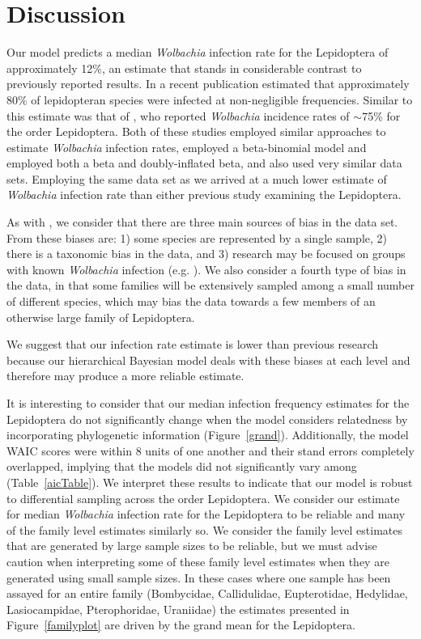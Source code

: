 \documentclass{frontiersSCNS}
\begin{document}
\section{Discussion}
Our model predicts a median \emph{Wolbachia} infection rate for the Lepidoptera of approximately 12\%, an estimate that stands in considerable contrast to previously reported results. In a recent publication \cite{Ahmed:2015aa} estimated that approximately 80\% of lepidopteran species were infected at non-negligible frequencies. Similar to this estimate was that of	 \cite{Weinert:2015aa}, who reported \emph{Wolbachia} incidence rates of $\sim$75\% for the order Lepidoptera. Both of these studies employed similar approaches to estimate \emph{Wolbachia} infection rates, \cite{Ahmed:2015aa} employed a beta-binomial model  and \cite{Weinert:2015aa} employed both a beta and doubly-inflated beta, and also used very similar data sets. Employing the same data set as \cite{Weinert:2015aa} we arrived at a much lower estimate of \emph{Wolbachia} infection rate than either previous study examining the Lepidoptera. 

As with \cite{Weinert:2015aa}, we consider that there are three main sources of bias in the data set. From \cite{Weinert:2015aa} these biases are: 1) some species are represented by a single sample, 2) there is a taxonomic bias in the data, and 3) research may be focused on groups with known \emph{Wolbachia} infection (e.g. \cite{Nice:2009p7399}). We also consider a fourth type of bias in the data, in that some families will be extensively sampled among a small number of different species, which may bias the data towards a few members of an otherwise large family of Lepidoptera.

We suggest that our infection rate estimate is lower than previous research because our hierarchical Bayesian model deals with these biases at each level and therefore may produce a more reliable estimate.

It is interesting to consider that our median infection frequency estimates for the Lepidoptera do not significantly change when the model considers relatedness by incorporating phylogenetic information (Figure~\ref{grand}). Additionally, the model WAIC scores were within 8 units of one another and their stand errors completely overlapped, implying that the models did not significantly vary among (Table~\ref{aicTable}). We interpret these results to indicate that our model is robust to differential sampling across the order Lepidoptera. We consider our estimate for median \emph{Wolbachia} infection rate for the Lepidoptera to be reliable and many of the family level estimates similarly so. We consider the family level estimates that are generated by large sample sizes to be reliable, but we must advise caution when interpreting some of these family level estimates when they are generated using small sample sizes. In these cases where one sample has been assayed for an entire family (Bombycidae, Callidulidae, Eupterotidae, Hedylidae, Lasiocampidae, Pterophoridae, Uraniidae) the estimates presented in Figure~\ref{familyplot} are driven by the grand mean for the Lepidoptera.
\end{document}
